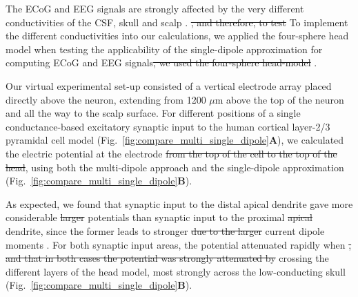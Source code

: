 \documentclass[preprint,10pt,authoryear]{elsarticle}
\newcommand{\sntxt}[1]{{\color{NavyBlue}#1}}
\begin{document}


The ECoG and EEG signals are strongly affected by the very different conductivities of the CSF, skull and scalp \citep{NUNEZ2006}\sntxt{. \sout{, and therefore, to test} To implement the different conductivities into our calculations, we applied the four-sphere head model when testing} the applicability of the single-dipole approximation for computing ECoG and EEG signals\sntxt{\sout{, we used the four-sphere head-model }}\citep{NAESS2017, HAGEN2018, HAGEN2019}.

\sntxt{Our virtual experimental set-up consisted of a vertical electrode array placed directly above the neuron, extending from 1200 $\mu$m above the top of the neuron and all the way to the scalp surface.}
For different positions of a single conductance-based excitatory synaptic input to the human cortical layer-2/3 pyramidal cell model \citep{EYAL2016}
(Fig.~\ref{fig:compare_multi_single_dipole}\textbf{A}), we calculated the electric potential \sntxt{at the electrode  \sout{from the top of the cell to the top of the head}}, using both the multi-dipole approach and the single-dipole approximation (Fig.~\ref{fig:compare_multi_single_dipole}\textbf{B}).


As expected, we found that synaptic input to the distal apical dendrite gave \sntxt{more considerable \sout{larger}} potentials than synaptic input to the proximal \sntxt{\sout{apical}} dendrite\sntxt{, since the former leads to stronger \sout{due to the larger}}  current dipole moments \citep{LINDEN2010, AHLFORS2015}\sntxt{. For both synaptic input areas, the potential attenuated rapidly when \sout{, and that in both cases the potential was strongly attenuated by}} crossing the different layers of the head model, most strongly across the low-conducting skull (Fig.~\ref{fig:compare_multi_single_dipole}\textbf{B}). 
\end{document}
